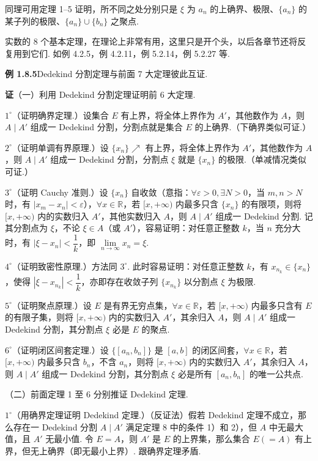 \documentclass[UTF8,12pt,a4paper,fontset=fandol]{ctexart}
\begin{document}
同理可用定理 1--5 证明，所不同之处分别只是 $\xi$ 为 $a_n$ 的上确界、极限、$\{a_n\}$ 的某子列的极限、$\{a_n\}\cup\{b_n\}$ 之聚点.

实数的 8 个基本定理，在理论上非常有用，这里只是开个头，以后各章节还将反复用到它们. 如例 4.2.5，例 4.2.11，例 5.2.14，例 5.2.27 等.

\noindent\textbf{例 1.8.5}\quad Dedekind 分割定理与前面 7 大定理彼此互证.

\noindent\textbf{证}\quad （一）利用 Dedekind 分割定理证明前 6 大定理.

$1^\circ$（证明确界定理.）设集合 $E$ 有上界，将全体上界作为 $A'$，其他数作为 $A$，则 $A\mid A'$ 组成一 Dedekind 分割，分割点就是集合 $E$ 的上确界.（下确界类似可证.）

$2^\circ$（证明单调有界原理.）设 $\{x_n\}\nearrow$ 有上界，将全体上界作为 $A'$，其他数作为 $A$，则 $A\mid A'$ 组成一 Dedekind 分割，分割点 $\xi$ 就是 $\{x_n\}$ 的极限.（单减情况类似可证.）

$3^\circ$（证明 Cauchy 准则.）设 $\{x_n\}$ 自收敛（意指：$\forall \varepsilon>0,\exists N>0$，当 $m,n>N$ 时，有 $|x_m-x_n|<\varepsilon$），$\forall x\in\mathbb{R}$，若 $[x,+\infty)$ 内最多只含 $\{x_n\}$ 的有限项，则将 $[x,+\infty)$ 内的实数归入 $A'$，其他实数归入 $A$，则 $A\mid A'$ 组成一 Dedekind 分割. 记其分割点为 $\xi$，不论 $\xi\in A$（或 $A'$），容易证明：对任意正整数 $k$，当 $n$ 充分大时，有 $|\xi-x_n|<\dfrac1k$，即 $\lim\limits_{n\to\infty}x_n=\xi$.

$4^\circ$（证明致密性原理.）方法同 $3^\circ$. 此时容易证明：对任意正整数 $k$，有 $x_{n_k}\in\{x_n\}$，使得 $|\xi-x_{n_k}|<\dfrac1k$，亦即存在收敛子列 $\{x_{n_k}\}$ 以分割点 $\xi$ 为极限.

$5^\circ$（证明聚点原理.）设 $E$ 是有界无穷点集，$\forall x\in\mathbb{R}$，若 $[x,+\infty)$ 内最多只含有 $E$ 的有限子集，则将 $[x,+\infty)$ 内的实数归入 $A'$，其余归入 $A$，则 $A\mid A'$ 组成一 Dedekind 分割，其分割点 $\xi$ 必是 $E$ 的聚点.

$6^\circ$（证明闭区间套定理.）设 $\{[a_n,b_n]\}$ 是 $[a,b]$ 的闭区间套，$\forall x\in\mathbb{R}$，若 $[x,+\infty)$ 内最多只含 $b_n$，不含 $a_n$，则将 $[x,+\infty)$ 内的实数归入 $A'$，其余归入 $A$，则 $A\mid A'$ 组成一 Dedekind 分割，其分割点 $\xi$ 必是所有 $[a_n,b_n]$ 的唯一公共点.

（二）前面定理 1 至 6 分别推证 Dedekind 定理.

$1^\circ$（用确界定理证明 Dedekind 定理.）（反证法）假若 Dedekind 定理不成立，那么存在一 Dedekind 分割 $A\mid A'$ 满足定理 8 中的条件 1）和 2），但 $A$ 中无最大值，且 $A'$ 无最小值. 令 $E=A$，则 $A'$ 是 $E$ 的上界集，那么集合 $E(=A)$ 有上界，但无上确界（即无最小上界）. 跟确界定理矛盾.
\end{document}
